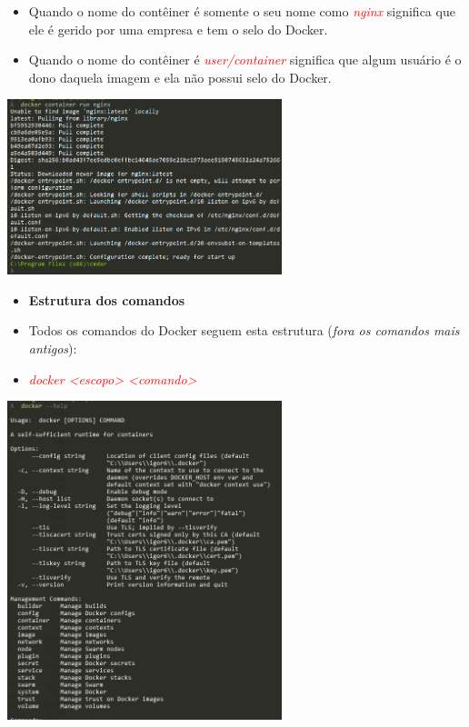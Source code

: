 \documentclass[10pt]{beamer}
\theoremstyle{remark}
\theoremstyle{definition}
\newcommand{\code}[1]{\textcolor{red} {\textit{#1}}} %
\begin{document}
\begin{frame}[allowframebreaks]
	\framebreak
	
	\begin{itemize}
		\item Quando o nome do contêiner é somente o seu nome como \code{nginx} significa que ele é gerido por uma empresa e tem o selo do Docker.
		
		\item Quando o nome do contêiner é \code{user/container} significa que algum usuário é o dono daquela imagem e ela não possui selo do Docker.
	\end{itemize}
	
	\framebreak
	
	\begin{center}
		\includegraphics[width=0.6\textwidth]{images/07.png}
	\end{center}	
	
	\framebreak
	
	\begin{itemize}
		\item \textbf{Estrutura dos comandos}
		
		\item Todos os comandos do Docker seguem esta estrutura (\textit{fora os comandos mais antigos}):
		
		\item \code{docker <escopo> <comando>}
		
	\end{itemize}
	
	
	\framebreak
		
	\begin{center}
		\includegraphics[width=0.6\textwidth]{images/05.png}
	\end{center}	
	

\end{frame}
\end{document}
